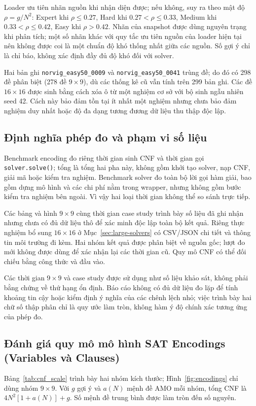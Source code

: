 \documentclass[a4paper,fleqn,nologo]{cas-sc}
\begin{document}
Loader ưu tiên nhãn nguồn khi nhận diện được; nếu không, suy ra theo mật độ $\rho=g/N^2$: Expert khi $\rho\le0.27$, Hard khi $0.27<\rho\le0.33$, Medium khi $0.33<\rho\le0.42$, Easy khi $\rho>0.42$. Nhãn của snapshot được dùng nguyên trạng khi phân tích; một số nhãn khác với quy tắc ưu tiên nguồn của loader hiện tại nên không được coi là một chuẩn độ khó thống nhất giữa các nguồn. Số gợi ý chỉ là chỉ báo, không xác định đầy đủ độ khó đối với solver.

Hai bản ghi \texttt{norvig\_easy50\_0009} và \texttt{norvig\_easy50\_0041} trùng đề; do đó có 298 đề phân biệt (278 đề $9\times9$), dù các thống kê cũ vẫn tính trên 299 bản ghi. Các đề $16\times16$ được sinh bằng cách xóa ô từ một nghiệm cơ sở với bộ sinh ngẫu nhiên seed 42. Cách này bảo đảm tồn tại ít nhất một nghiệm nhưng chưa bảo đảm nghiệm duy nhất hoặc độ đa dạng tương đương dữ liệu thu thập độc lập.

\subsection{Định nghĩa phép đo và phạm vi số liệu}
Benchmark encoding đo riêng thời gian sinh CNF và thời gian gọi \texttt{solver.solve()}; tổng là tổng hai pha này, không gồm khởi tạo solver, nạp CNF, giải mã hoặc kiểm tra nghiệm. Benchmark solver đo toàn bộ lời gọi hàm giải, bao gồm dựng mô hình và các chi phí nằm trong wrapper, nhưng không gồm bước kiểm tra nghiệm bên ngoài. Vì vậy hai loại thời gian không thể so sánh trực tiếp.

Các bảng và hình $9\times9$ cùng thời gian case study trình bày số liệu đã ghi nhận nhưng chưa có đủ dữ liệu thô để xác minh độc lập toàn bộ kết quả. Riêng thực nghiệm bổ sung $16\times16$ ở Mục~\ref{sec:large-solvers} có CSV/JSON chi tiết và thông tin môi trường đi kèm. Hai nhóm kết quả được phân biệt về nguồn gốc; lượt đo mới không được dùng để xác nhận lại các thời gian cũ. Quy mô CNF có thể đối chiếu bằng công thức và đầu vào.

Các thời gian $9\times9$ và case study được sử dụng như số liệu khảo sát, không phải bằng chứng về thứ hạng ổn định. Báo cáo không có đủ dữ liệu đo lặp để tính khoảng tin cậy hoặc kiểm định ý nghĩa của các chênh lệch nhỏ; việc trình bày hai chữ số thập phân chỉ là quy ước làm tròn, không hàm ý độ chính xác tương ứng của phép đo.

\subsection{Đánh giá quy mô mô hình SAT Encodings (Variables và Clauses)}
\label{sec:exp-scale}
Bảng~\ref{tab:cnf_scale} trình bày hai nhóm kích thước; Hình~\ref{fig:encodings} chỉ dùng nhóm $9\times9$. Với $g$ gợi ý và $a(N)$ mệnh đề AMO mỗi nhóm, tổng CNF là $4N^2[1+a(N)]+g$. Số mệnh đề trung bình được làm tròn đến số nguyên.
\end{document}

